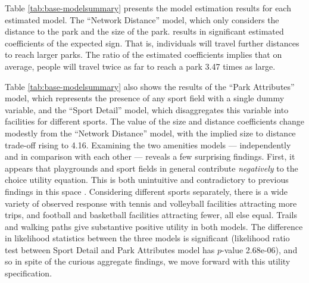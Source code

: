 \documentclass[3p, authoryear, review]{elsarticle} %
\begin{document}
Table \ref{tab:base-modelsummary} presents the model estimation results for
each estimated model. The ``Network Distance'' model, which only considers the
distance to the park and the size of the park. results in significant estimated
coefficients of the expected sign. That is, individuals will travel further
distances to reach larger parks. The ratio of the estimated coefficients implies
that on average, people will travel twice as far to reach a park 3.47
times as large.

Table \ref{tab:base-modelsummary} also shows the results of the ``Park
Attributes'' model, which represents the presence of any sport field with a
single dummy variable, and the ``Sport Detail'' model, which disaggregates this
variable into facilities for different sports. The value of the size and
distance coefficients change modestly from the ``Network Distance'' model, with
the implied size to distance trade-off rising to 4.16. Examining
the two amenities models --- independently and in comparison with each other ---
reveals a few surprising findings. First, it appears that playgrounds and sport
fields in general contribute \emph{negatively} to the choice utility equation. This
is both unintuitive and contradictory to previous findings in this space \citep[e.g.,][]{Kinnell2006}. Considering different sports separately, there is a wide variety
of observed response with tennis and volleyball facilities attracting more
trips, and football and basketball facilities attracting fewer, all else equal.
Trails and walking paths give substantive positive utility in both models. The
difference in likelihood statistics between the three models is significant
(likelihood ratio test between Sport Detail and Park Attributes model has
\(p\)-value 2.68e-06), and so in spite of the curious aggregate findings,
we move forward with this utility specification.
\end{document}

